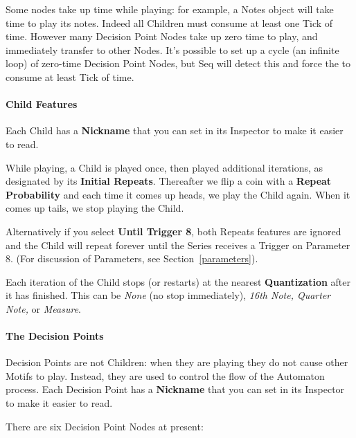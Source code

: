 \documentclass[twoside,10pt]{article}
\begin{document}
Some nodes take up time while playing: for example, a Notes object will take time to play its notes.  Indeed all Children must consume at least one Tick of time.  However many Decision Point Nodes take up zero time to play, and immediately transfer to other Nodes.  It's possible to set up a cycle (an infinite loop) of zero-time Decision Point Nodes, but Seq will detect this and force the to consume at least Tick of time.

\paragraph{Child Features}

Each Child has a {\bf Nickname} that you can set in its Inspector to make it easier to read.

While playing, a Child is played once, then played additional iterations, as designated by its {\bf Initial Repeats}.  Thereafter we flip a coin with a {\bf Repeat Probability} and each time it comes up heads, we play the Child again.  When it comes up tails, we stop playing the Child.

Alternatively if you select {\bf Until Trigger 8}, both Repeats features are ignored and the Child  will repeat forever until the Series receives a Trigger on Parameter 8.  (For discussion of Parameters, see Section~\ref{parameters}).

Each iteration of the Child stops (or restarts) at the nearest {\bf Quantization} after it has finished.  This can be {\it None} (no stop immediately), {\it 16th Note, Quarter Note,} or {\it Measure}.



\paragraph{The Decision Points}

Decision Points are not Children: when they are playing they do not cause other Motifs to play.  Instead, they are used to control the flow of the Automaton process.    Each Decision Point has a {\bf Nickname} that you can set in its Inspector to make it easier to read.  

There are six Decision Point Nodes at present:
\end{document}

